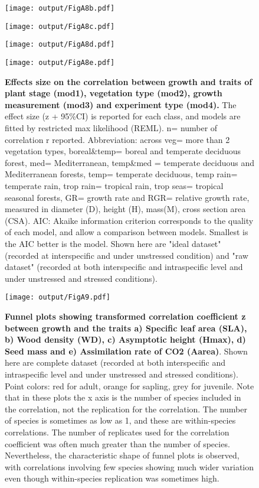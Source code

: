 \documentclass[a4paper]{article}\usepackage[]{graphicx}\usepackage[]{color}
\begin{document}
\begin{appendices}
\begin{figure}[htbp]
\centering
\texttt{[image: output/FigA8b.pdf]}
\end{figure}

\begin{figure}[htbp]
\centering
\texttt{[image: output/FigA8c.pdf]}
\end{figure}

\begin{figure}[htbp]
\texttt{[image: output/FigA8d.pdf]}
\centering
\end{figure}

\begin{figure}[htbp]
\centering
\texttt{[image: output/FigA8e.pdf]}
\caption{\textbf{Effects size on the correlation between growth and traits of plant stage (mod1), vegetation type (mod2), growth measurement (mod3) and experiment type (mod4).} The effect size (z + 95\%CI) is reported for each class, and models are fitted by restricted max likelihood (REML). n= number of correlation r reported. Abbreviation: across veg= more than 2 vegetation types, boreal\&temp= boreal and temperate deciduous forest, med= Mediterranean,  temp\&med = temperate deciduous and Mediterranean forests, temp= temperate deciduous, temp rain= temperate rain, trop rain= tropical rain, trop seas= tropical seasonal forests, GR= growth rate and RGR= relative growth rate, measured in diameter (D), height (H), mass(M), cross section area (CSA). AIC: Akaike information criterion corresponds to the quality of each model, and allow a comparison between models. Smallest is the AIC better is the model. Shown here are "ideal dataset" (recorded at interspecific and under unstressed condition) and "raw dataset" (recorded at both interspecific and intraspecific level and under unstressed and stressed conditions).}
\label{FigA8}
\end{figure}

\begin{figure}[htbp]
\centering
\texttt{[image: output/FigA9.pdf]}
\caption{\textbf{Funnel plots showing transformed correlation coefficient z between growth and the traits a) Specific leaf area (SLA), b) Wood density (WD), c) Asymptotic height (Hmax), d) Seed mass and e) Assimilation rate of CO2 (Aarea)}. Shown here are complete dataset (recorded at both interspecific and intraspecific level and under unstressed and stressed conditions). Point colors: red for adult, orange for sapling, grey for juvenile. Note that in these plots the x axis is the number of species included in the correlation, not the replication for the correlation. The number of species is sometimes as low as 1, and these are within-species correlations. The number of replicates used for the correlation coefficient was often much greater than the number of species. Nevertheless, the characteristic shape of funnel plots is observed, with correlations involving few species showing much wider variation even though within-species replication was sometimes high.}


\end{figure}
\end{appendices}
\end{document}
